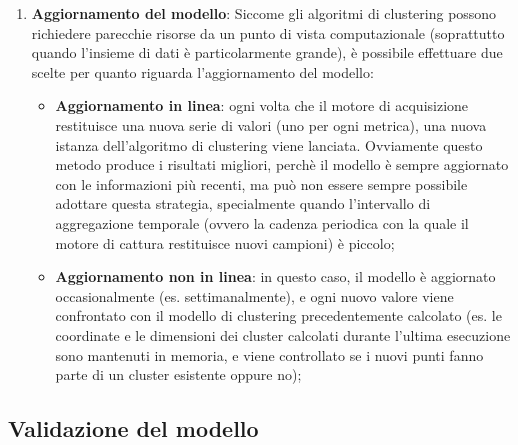 \documentclass[12pt,a4paper,cucitura]{toptesi}
\begin{document}
\begin{enumerate}
\begin{itemize}
\end{itemize}

\item \textbf{Aggiornamento del modello}: Siccome gli algoritmi di clustering possono richiedere parecchie risorse da un punto di vista computazionale (soprattutto quando l'insieme di dati è particolarmente grande), è possibile effettuare due scelte per quanto riguarda l'aggiornamento del modello:
\begin{itemize}
\item \textbf{Aggiornamento in linea}: ogni volta che il motore di acquisizione restituisce una nuova serie di valori (uno per ogni metrica), una nuova istanza dell'algoritmo di clustering viene lanciata. Ovviamente questo metodo produce i risultati migliori, perchè il modello è sempre aggiornato con le informazioni più recenti, ma può non essere sempre possibile adottare questa strategia, specialmente quando l'intervallo di aggregazione temporale (ovvero la cadenza periodica con la quale il motore di cattura restituisce nuovi campioni) è piccolo;
\item \textbf{Aggiornamento non in linea}: in questo caso, il modello è aggiornato occasionalmente (es. settimanalmente), e ogni nuovo valore viene confrontato con il modello di clustering precedentemente  calcolato (es. le coordinate e le dimensioni dei cluster calcolati durante l'ultima esecuzione sono mantenuti in memoria, e viene controllato se i nuovi punti fanno parte di un cluster esistente oppure no);
\end{itemize}
\end{enumerate}

\subsection{Validazione del modello}
\end{document}
